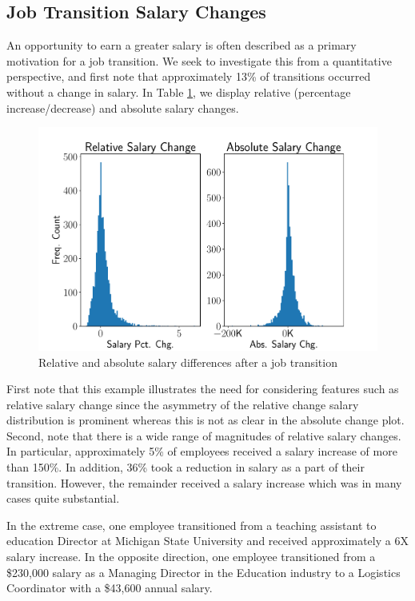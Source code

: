 \documentclass[10pt]{article}
\begin{document}
\subsection{Job Transition Salary Changes}
An opportunity to earn a greater salary is often described as a primary motivation 
for a job transition.  We seek to investigate this from a quantitative perspective, 
and first note that approximately 
13\% of transitions occurred without a change in salary. 
In Table \ref{fig:salgr}, we display relative (percentage increase/decrease) and  
absolute salary changes. 
%
\begin{figure}[thb]
    \centering
    \includegraphics[width=1.0\linewidth]{salgr.pdf}
	\caption{Relative and absolute salary differences after a job transition}
	\label{fig:salgr}
\end{figure}
%
First note that this example illustrates the need for considering 
features such as relative salary change since the asymmetry of the relative change salary distribution is 
prominent whereas this is not as clear in the absolute change plot.  
Second, note that there is a wide range of magnitudes of relative salary changes.  In particular, 
approximately 5\% of employees received a salary increase of more than 150\%.  In 
addition, 36\% took a reduction in salary as a part of their transition.  However, the remainder 
received a salary increase which was in many cases quite substantial. 

In the extreme case, one employee transitioned from a teaching assistant to 
education Director at Michigan State University and received approximately a 6X 
salary increase.  In the opposite direction, one employee transitioned from a \$230,000 
salary as a Managing Director in the Education industry to a Logistics Coordinator 
with a \$43,600 annual salary. 
\end{document}
